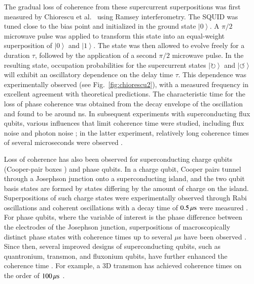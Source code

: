 \documentclass[3p,sort&compress]{elsarticle}
\newcommand{\ket}[1]{\left\vert{#1}\right\rangle}
\begin{document}
The gradual loss of coherence from these supercurrent superpositions was first measured by Chiorescu et al.\ \cite{Chiorescu:2003:ta} using Ramsey interferometry. The SQUID was tuned close to the bias point and initialized in the ground state $\ket{0}$. A $\pi/2$ microwave pulse was applied to transform this state into an equal-weight superposition of $\ket{0}$ and $\ket{1}$. The state was then allowed to evolve freely for a duration $\tau$, followed by the application of a second $\pi/2$ microwave pulse. In the resulting state, occupation probabilities for the supercurrent states $\ket{\circlearrowright}$ and $\ket{\circlearrowleft}$ will exhibit an oscillatory dependence on the delay time $\tau$. This dependence was experimentally observed (see Fig.~\ref{fig:chiorescu2}), with a measured frequency in excellent agreement with theoretical predictions. The characteristic time for the loss of phase coherence was obtained from the decay envelope of the oscillation and found to be around \unit[20]{ns}. In subsequent experiments with superconducting flux qubits, various influences that limit coherence time were studied, including flux noise \cite{Yoshihara:2006:ii,Bialczak:2007:uu} and photon noise \cite{Bertet:2005:un}; in the latter experiment, relatively long coherence times of several microseconds were observed \cite{Bertet:2005:un}. 

Loss of coherence has also been observed for superconducting charge qubits (Cooper-pair boxes \cite{Bouchiat:1998:ii}) and phase qubits. In a charge qubit, Cooper pairs tunnel through a Josephson junction onto a superconducting island, and the two qubit basis states are formed by states differing by the amount of charge on the island. Superpositions of such charge states were experimentally observed through Rabi oscillations \cite{Nakamura:1999:ub} and coherent oscillations with a decay time of $\unit[0.5]{\mu s}$ were measured \cite{Vion:2002:oo}. For phase qubits, where the variable of interest is the phase difference between the electrodes of the Josephson junction, superpositions of macroscopically distinct phase states with coherence times up to several $\mu$s have been observed \cite{Yu:2002:yb,Martinis:2002:qq}. Since then, several improved designs of superconducting qubits, such as quantronium, transmon, and fluxonium qubits, have further enhanced the coherence time \cite{Devoret:2013:pp}. For example, a 3D transmon has achieved coherence times on the order of $\unit[100]{\mu s}$ \cite{Rigetti:2012:aa,Sears:2012:ee}.
\end{document}
